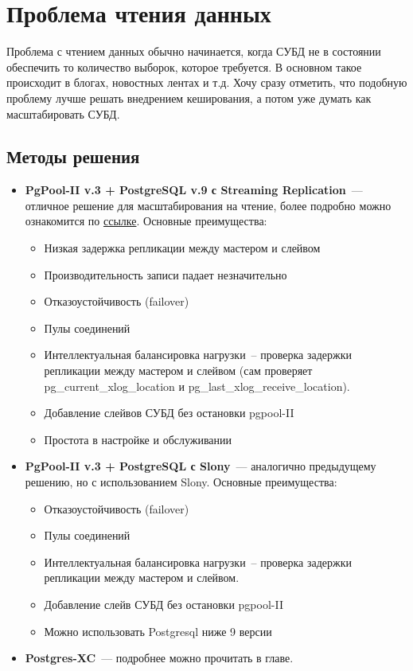 \section{Проблема чтения данных}

Проблема с чтением данных обычно начинается, когда СУБД не в состоянии обеспечить то количество выборок, которое требуется.
В основном такое происходит в блогах, новостных лентах и т.д. Хочу сразу отметить, что подобную проблему лучше решать
внедрением кеширования, а потом уже думать как масштабировать СУБД.

\subsection{Методы решения}

\begin{itemize}
\item \textbf{PgPool-II v.3 + PostgreSQL v.9 с Streaming Replication}~--- отличное решение для масштабирования на чтение,
более подробно можно ознакомится по \href{http://pgpool.projects.pgfoundry.org/contrib\_docs/simple\_sr\_setting/index.html}{ссылке}.
Основные преимущества:
\begin{itemize}
\item Низкая задержка репликации между мастером и слейвом
\item Производительность записи падает незначительно
\item Отказоустойчивость (failover)
\item Пулы соединений
\item Интеллектуальная балансировка нагрузки~-- проверка задержки репликации между мастером и слейвом (сам проверяет pg\_current\_xlog\_location и pg\_last\_xlog\_receive\_location).
\item Добавление слейвов СУБД без остановки pgpool-II
\item Простота в настройке и обслуживании
\end{itemize}

\item \textbf{PgPool-II v.3 + PostgreSQL с Slony}~--- аналогично предыдущему решению, но с использованием Slony.
Основные преимущества:
\begin{itemize}
\item Отказоустойчивость (failover)
\item Пулы соединений
\item Интеллектуальная балансировка нагрузки~-- проверка задержки репликации между мастером и слейвом.
\item Добавление слейв СУБД без остановки pgpool-II
\item Можно использовать Postgresql ниже 9 версии
\end{itemize}

\item \textbf{Postgres-XC}~--- подробнее можно прочитать в  главе.
\end{itemize}
